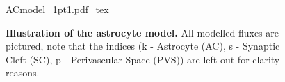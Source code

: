 \documentclass[12pt]{article}
\begin{document}
\begin{figure}[h!]
  \centering
  \def\svgwidth{450pt} %
  \scriptsize
  {ACmodel_1pt1.pdf_tex}
  \caption{\textbf{Illustration of the astrocyte model.} All modelled fluxes are pictured, note that the indices (k - Astrocyte (AC), s - Synaptic Cleft (SC), p - Perivascular Space (PVS)) are left out for clarity reasons.}
\label{fig:ACmodel}
\end{figure}
\vspace{3cm}
\end{document}
